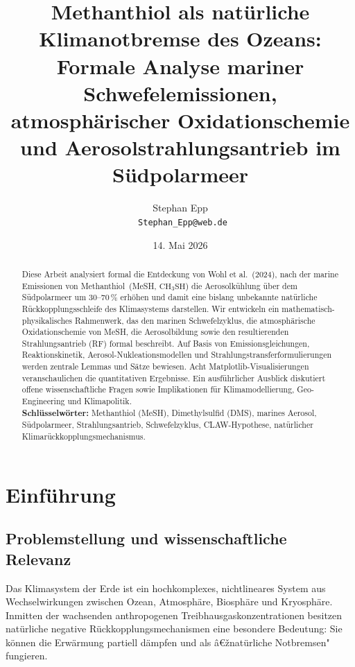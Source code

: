 ﻿\documentclass[a4paper,12pt]{article}
\title{\textbf{Methanthiol als natürliche Klimanotbremse des Ozeans:}\\
\large Formale Analyse mariner Schwefelemissionen, atmosphärischer Oxidationschemie\\
und Aerosolstrahlungsantrieb im Südpolarmeer}
\author{Stephan Epp\\
\
\small \texttt{Stephan\_Epp@web.de}}
\date{14. Mai 2026}
\theoremstyle{definition}
\begin{document}
\maketitle

\begin{abstract}
Diese Arbeit analysiert formal die Entdeckung von Wohl et al.~(2024), nach der marine Emissionen von
Methanthiol~(MeSH, \(\mathrm{CH_3SH}\)) die Aerosolkühlung über dem Südpolarmeer um 30--70\,\%
erhöhen und damit eine bislang unbekannte natürliche Rückkopplungsschleife des Klimasystems
darstellen. Wir entwickeln ein mathematisch-physikalisches Rahmenwerk, das den marinen
Schwefelzyklus, die atmosphärische Oxidationschemie von MeSH, die Aerosolbildung sowie den
resultierenden Strahlungsantrieb (RF) formal beschreibt. Auf Basis von Emissionsgleichungen,
Reaktionskinetik, Aerosol-Nukleationsmodellen und Strahlungstransferformulierungen werden zentrale
Lemmas und Sätze bewiesen. Acht Matplotlib-Visualisierungen veranschaulichen die quantitativen
Ergebnisse. Ein ausführlicher Ausblick diskutiert offene wissenschaftliche Fragen sowie
Implikationen für Klimamodellierung, Geo-Engineering und Klimapolitik.\\[0.4em]
\textbf{Schlüsselwörter:} Methanthiol (MeSH), Dimethylsulfid (DMS), marines Aerosol, Südpolarmeer,
Strahlungsantrieb, Schwefelzyklus, CLAW-Hypothese, natürlicher Klimarückkopplungsmechanismus.
\end{abstract}

\tableofcontents
\newpage

\section{Einführung}

\subsection{Problemstellung und wissenschaftliche Relevanz}

Das Klimasystem der Erde ist ein hochkomplexes, nichtlineares System aus Wechselwirkungen zwischen
Ozean, Atmosphäre, Biosphäre und Kryosphäre. Inmitten der wachsenden anthropogenen Treibhausgaskonzentrationen
besitzen natürliche negative Rückkopplungsmechanismen eine besondere Bedeutung: Sie können die
Erwärmung partiell dämpfen und als â€žnatürliche Notbremsen" fungieren.
\end{document}
